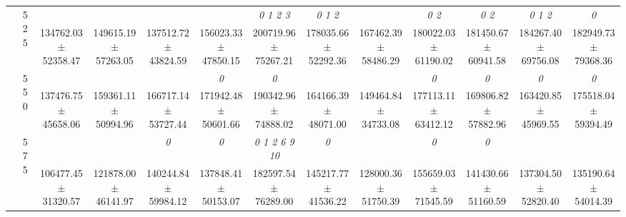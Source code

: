\begin{table}[h]
{\begin{tabular}{
        ccccccccccccc}
 & \multirow{2}{*}{525}& \cellcolor[HTML]{EFEFEF} & \cellcolor[HTML]{EFEFEF} & \cellcolor[HTML]{EFEFEF} & \cellcolor[HTML]{EFEFEF} & \cellcolor[HTML]{EFEFEF} \textit{ 0 1 2 3 }& \cellcolor[HTML]{EFEFEF} \textit{ 0 1 2 }& \cellcolor[HTML]{EFEFEF} & \cellcolor[HTML]{EFEFEF} \textit{ 0 2 }& \cellcolor[HTML]{EFEFEF} \textit{ 0 2 }& \cellcolor[HTML]{EFEFEF} \textit{ 0 1 2 }& \cellcolor[HTML]{EFEFEF} \textit{ 0 } \\ 
 & & \cellcolor[HTML]{EFEFEF} 134762.03 $\pm$ 52358.47& \cellcolor[HTML]{EFEFEF} 149615.19 $\pm$ 57263.05& \cellcolor[HTML]{EFEFEF} 137512.72 $\pm$ 43824.59& \cellcolor[HTML]{EFEFEF} 156023.33 $\pm$ 47850.15& \cellcolor[HTML]{EFEFEF} 200719.96 $\pm$ 75267.21& \cellcolor[HTML]{EFEFEF} 178035.66 $\pm$ 52292.36& \cellcolor[HTML]{EFEFEF} 167462.39 $\pm$ 58486.29& \cellcolor[HTML]{EFEFEF} 180022.03 $\pm$ 61190.02& \cellcolor[HTML]{EFEFEF} 181450.67 $\pm$ 60941.58& \cellcolor[HTML]{EFEFEF} 184267.40 $\pm$ 69756.08& \cellcolor[HTML]{EFEFEF} 182949.73 $\pm$ 79368.36 \\ 
 & \multirow{2}{*}{550}& & & & \textit{ 0 }& \textit{ 0 }& & & \textit{ 0 }& \textit{ 0 }& \textit{ 0 }& \textit{ 0 } \\ 
 & & 137476.75 $\pm$ 45658.06& 159361.11 $\pm$ 50994.96& 166717.14 $\pm$ 53727.44& 171942.48 $\pm$ 50601.66& 190342.96 $\pm$ 74888.02& 164166.39 $\pm$ 48071.00& 149464.84 $\pm$ 34733.08& 177113.11 $\pm$ 63412.12& 169806.82 $\pm$ 57882.96& 163420.85 $\pm$ 45969.55& 175518.04 $\pm$ 59394.49 \\ 
 & \multirow{2}{*}{575}& \cellcolor[HTML]{EFEFEF} & \cellcolor[HTML]{EFEFEF} & \cellcolor[HTML]{EFEFEF} \textit{ 0 }& \cellcolor[HTML]{EFEFEF} \textit{ 0 }& \cellcolor[HTML]{EFEFEF} \textit{  0  1  2  6  9 10 }& \cellcolor[HTML]{EFEFEF} \textit{ 0 }& \cellcolor[HTML]{EFEFEF} & \cellcolor[HTML]{EFEFEF} \textit{ 0 }& \cellcolor[HTML]{EFEFEF} \textit{ 0 }& \cellcolor[HTML]{EFEFEF} & \cellcolor[HTML]{EFEFEF}  \\ 
 & & \cellcolor[HTML]{EFEFEF} 106477.45 $\pm$ 31320.57& \cellcolor[HTML]{EFEFEF} 121878.00 $\pm$ 46141.97& \cellcolor[HTML]{EFEFEF} 140244.84 $\pm$ 59984.12& \cellcolor[HTML]{EFEFEF} 137848.41 $\pm$ 50153.07& \cellcolor[HTML]{EFEFEF} 182597.54 $\pm$ 76289.00& \cellcolor[HTML]{EFEFEF} 145217.77 $\pm$ 41536.22& \cellcolor[HTML]{EFEFEF} 128000.36 $\pm$ 51750.39& \cellcolor[HTML]{EFEFEF} 155659.03 $\pm$ 71545.59& \cellcolor[HTML]{EFEFEF} 141430.66 $\pm$ 51160.59& \cellcolor[HTML]{EFEFEF} 137304.50 $\pm$ 52820.40& \cellcolor[HTML]{EFEFEF} 135190.64 $\pm$ 54014.39 \\ 

\end{tabular}}
\end{table}
